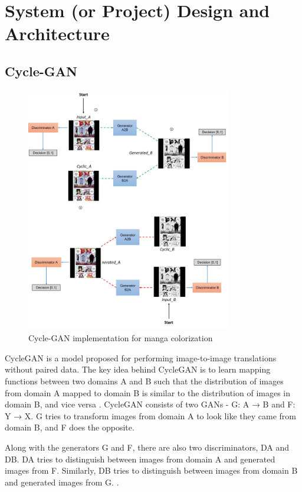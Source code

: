 \chapter{System (or Project) Design and Architecture}

 

\section{Cycle-GAN}
\begin{figure}[htbp]
  \centering
  \includegraphics[width=0.8\textwidth]{img/GAN_block_diagram.png}
  \caption{Cycle-GAN implementation for manga colorization}
  \label{fig:cycle-gan-implementation}
\end{figure}
CycleGAN \cite{zhu2017unpaired} is a model proposed for performing image-to-image translations without paired data. The key idea behind CycleGAN is to learn mapping functions between two domains A and B such that the distribution of images from domain A mapped to domain B is similar to the distribution of images in domain B, and vice versa .
\pagebreak
CycleGAN consists of two GANs - G: A → B and F: Y → X. G tries to transform images from domain A to look like they came from domain B, and F does the opposite.

Along with the generators G and F, there are also two discriminators, DA and DB. DA tries to distinguish between images from domain A and generated images from F. Similarly, DB tries to distinguish between images from domain B and generated images from G. \cite{zhu2020unpaired}.
\\
       
